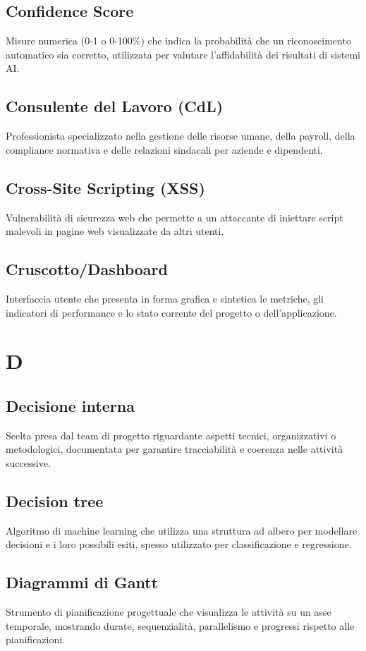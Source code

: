 \documentclass[a4paper,11pt]{article}
\begin{document}
\subsection{Confidence Score}
Misure numerica (0-1 o 0-100\%) che indica la probabilità che un riconoscimento automatico sia corretto, utilizzata per valutare l'affidabilità dei risultati di sistemi AI.

\subsection{Consulente del Lavoro (CdL)}
Professionista specializzato nella gestione delle risorse umane, della payroll, della compliance normativa e delle relazioni sindacali per aziende e dipendenti.

\subsection{Cross-Site Scripting (XSS)}
Vulnerabilità di sicurezza web che permette a un attaccante di iniettare script malevoli in pagine web visualizzate da altri utenti.

\subsection{Cruscotto/Dashboard}
Interfaccia utente che presenta in forma grafica e sintetica le metriche, gli indicatori di performance e lo stato corrente del progetto o dell'applicazione.

\newpage
\section{D}

\subsection{Decisione interna}
Scelta presa dal team di progetto riguardante aspetti tecnici, organizzativi o metodologici, documentata per garantire tracciabilità e coerenza nelle attività successive.

\subsection{Decision tree}
Algoritmo di machine learning che utilizza una struttura ad albero per modellare decisioni e i loro possibili esiti, spesso utilizzato per classificazione e regressione.

\subsection{Diagrammi di Gantt}
Strumento di pianificazione progettuale che visualizza le attività su un asse temporale, mostrando durate, sequenzialità, parallelismo e progressi rispetto alle pianificazioni.
\end{document}
